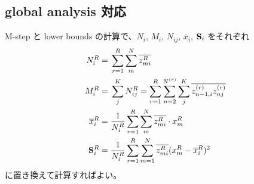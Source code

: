 \subsection{ global analysis 対応 }

M-step と lower bounds の計算で、$N_i$, $M_i$, $N_{ij}$, $\overline{x}_i$, ${\bf S}_i$ をそれぞれ
\begin{align}
  N_i^R  =\;&  \sum_{r=1}^R \sum_m^N \overline{z_{mi}^R}  \\
  M_i^R  =\;&  \sum_j^K N_{ij}^R = \sum_{r=1}^R \sum_{n=2}^{N^{(r)}} \sum_j^K \overline{ z_{n-1, i}^{(r)} z_{nj}^{(r)} }  \\
  \overline{x}_i^R  =\;&  \frac{1}{N_i^R} \sum_{r=1}^R \sum_m^N \overline{z_{mi}^R} \cdot x_m^R  \\
  {\bf S}_i^R  =\;&  \frac{1}{N_i^R} \sum_{r=1}^R \sum_{m=1}^N \overline{z_{mi}^R} (x_m^R - \overline{x}_i^R)^2
\end{align}
に置き換えて計算すればよい。


%
